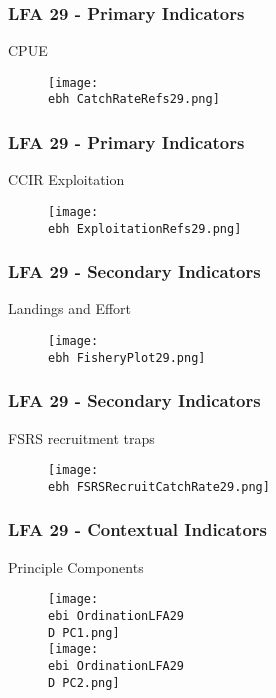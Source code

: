 \documentclass{beamer}
\newcommand{\ebh}{\string~/bio.data/bio.lobster/figures/Assessment/LFA2732/} %
\newcommand{\ebi}{\string~/bio.data/bio.lobster/figures/Assessment/Indicators/} %
\newcommand{\D}{.}
\begin{document}
\begin{frame}
\frametitle{LFA 29 - Primary Indicators}
CPUE
\begin{figure}
        \begin{center}
            \texttt{[image: \\ebh CatchRateRefs29.png]}
        \end{center}
    \end{figure}
\end{frame}



\begin{frame}
\frametitle{LFA 29 - Primary Indicators}
CCIR Exploitation 
\begin{figure}
        \begin{center}
            \texttt{[image: \\ebh ExploitationRefs29.png]}
        \end{center}
    \end{figure}
\end{frame}




\begin{frame}
\frametitle{LFA 29 - Secondary Indicators}
Landings and Effort
\begin{figure}
        \begin{center}
            \texttt{[image: \\ebh FisheryPlot29.png]}
        \end{center}
    \end{figure}
\end{frame}



\begin{frame}
\frametitle{LFA 29 - Secondary Indicators}
FSRS recruitment traps
\begin{figure}
        \begin{center}
            \texttt{[image: \\ebh FSRSRecruitCatchRate29.png]}
        \end{center}
    \end{figure}
\end{frame}



\begin{frame}
\frametitle{LFA 29 - Contextual Indicators}
Principle Components
\begin{figure}
        \begin{center}
            \texttt{[image: \\ebi OrdinationLFA29\\D PC1.png]}\\
            \texttt{[image: \\ebi OrdinationLFA29\\D PC2.png]}
        \end{center}
    \end{figure}
\end{frame}
\end{document}
